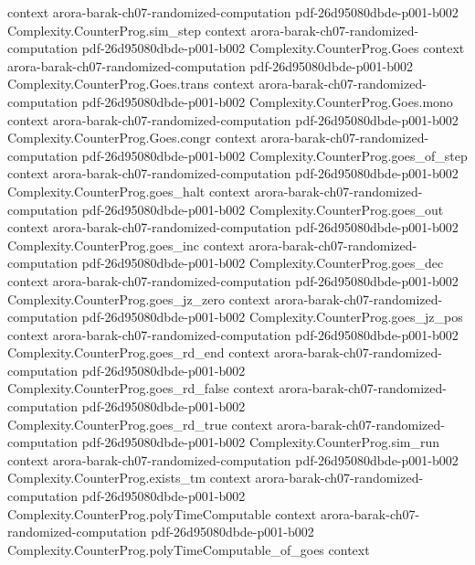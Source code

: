 \begin{theorem}
  {context}
  {arora-barak-ch07-randomized-computation}
  {pdf-26d95080dbde-p001-b002}
\proofstep
  {Complexity.CounterProg.sim_step}
  {context}
  {arora-barak-ch07-randomized-computation}
  {pdf-26d95080dbde-p001-b002}
\proofstep
  {Complexity.CounterProg.Goes}
  {context}
  {arora-barak-ch07-randomized-computation}
  {pdf-26d95080dbde-p001-b002}
\proofstep
  {Complexity.CounterProg.Goes.trans}
  {context}
  {arora-barak-ch07-randomized-computation}
  {pdf-26d95080dbde-p001-b002}
\proofstep
  {Complexity.CounterProg.Goes.mono}
  {context}
  {arora-barak-ch07-randomized-computation}
  {pdf-26d95080dbde-p001-b002}
\proofstep
  {Complexity.CounterProg.Goes.congr}
  {context}
  {arora-barak-ch07-randomized-computation}
  {pdf-26d95080dbde-p001-b002}
\proofstep
  {Complexity.CounterProg.goes_of_step}
  {context}
  {arora-barak-ch07-randomized-computation}
  {pdf-26d95080dbde-p001-b002}
\proofstep
  {Complexity.CounterProg.goes_halt}
  {context}
  {arora-barak-ch07-randomized-computation}
  {pdf-26d95080dbde-p001-b002}
\proofstep
  {Complexity.CounterProg.goes_out}
  {context}
  {arora-barak-ch07-randomized-computation}
  {pdf-26d95080dbde-p001-b002}
\proofstep
  {Complexity.CounterProg.goes_inc}
  {context}
  {arora-barak-ch07-randomized-computation}
  {pdf-26d95080dbde-p001-b002}
\proofstep
  {Complexity.CounterProg.goes_dec}
  {context}
  {arora-barak-ch07-randomized-computation}
  {pdf-26d95080dbde-p001-b002}
\proofstep
  {Complexity.CounterProg.goes_jz_zero}
  {context}
  {arora-barak-ch07-randomized-computation}
  {pdf-26d95080dbde-p001-b002}
\proofstep
  {Complexity.CounterProg.goes_jz_pos}
  {context}
  {arora-barak-ch07-randomized-computation}
  {pdf-26d95080dbde-p001-b002}
\proofstep
  {Complexity.CounterProg.goes_rd_end}
  {context}
  {arora-barak-ch07-randomized-computation}
  {pdf-26d95080dbde-p001-b002}
\proofstep
  {Complexity.CounterProg.goes_rd_false}
  {context}
  {arora-barak-ch07-randomized-computation}
  {pdf-26d95080dbde-p001-b002}
\proofstep
  {Complexity.CounterProg.goes_rd_true}
  {context}
  {arora-barak-ch07-randomized-computation}
  {pdf-26d95080dbde-p001-b002}
\proofstep
  {Complexity.CounterProg.sim_run}
  {context}
  {arora-barak-ch07-randomized-computation}
  {pdf-26d95080dbde-p001-b002}
\proofstep
  {Complexity.CounterProg.exists_tm}
  {context}
  {arora-barak-ch07-randomized-computation}
  {pdf-26d95080dbde-p001-b002}
\proofstep
  {Complexity.CounterProg.polyTimeComputable}
  {context}
  {arora-barak-ch07-randomized-computation}
  {pdf-26d95080dbde-p001-b002}
\proofstep
  {Complexity.CounterProg.polyTimeComputable_of_goes}
  {context}

\end{theorem}
